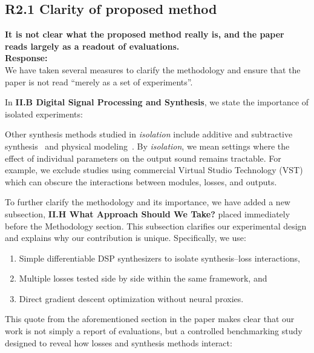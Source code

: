\documentclass[11pt]{article}
\begin{document}
\subsection{R2.1 Clarity of proposed method}
\label{R2.1}
\noindent \textbf{It is not clear what the proposed method really is, and the paper reads largely as a readout of evaluations. } 
\\

\noindent\textbf{Response:} \\
We have taken several measures to clarify the methodology and ensure that the paper is not read ``merely as a set of experiments''.  

\medskip
\noindent In \textbf{II.B Digital Signal Processing and Synthesis}, we state the importance of isolated experiments:
\begin{displayquote}
    
Other synthesis methods studied in \textit{isolation} include additive and subtractive synthesis~\cite{engel2020ddsp,masuda2023improving,salimi2020make} and physical modeling~\cite{riionheimo2003parameter,han2024learning}. By \textit{isolation}, we mean settings where the effect of individual parameters on the output sound remains tractable. For example, we exclude studies using commercial Virtual Studio Technology (VST) which can obscure the interactions between modules, losses, and outputs. 
\end{displayquote}

\noindent To further clarify the methodology and its importance, we have added a new subsection, \textbf{II.H What Approach Should We Take?} placed immediately before the Methodology section. This subsection clarifies our experimental design and explains why our contribution is unique. Specifically, we use:  
\begin{enumerate}
  \item Simple differentiable DSP synthesizers to isolate synthesis--loss interactions,  
  \item Multiple losses tested side by side within the same framework, and  
  \item Direct gradient descent optimization without neural proxies.  
\end{enumerate}

This quote from the aforementioned section in the paper makes clear that our work is not simply a report of evaluations, but a controlled benchmarking study designed to reveal how losses and synthesis methods interact: 
\end{document}
